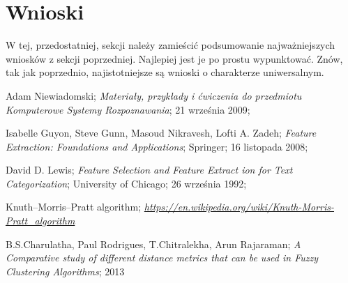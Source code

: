 \documentclass{classrep}
\begin{document}
\section{Wnioski}
{\color{blue}W tej, przedostatniej, sekcji należy zamieścić podsumowanie
najważniejszych wniosków z sekcji poprzedniej. Najlepiej jest je po prostu
wypunktować. Znów, tak jak poprzednio, najistotniejsze są wnioski o
charakterze uniwersalnym.}


\begin{thebibliography}{0}

 Adam Niewiadomski;
\textsl{Materiały, przykłady i ćwiczenia do przedmiotu
Komputerowe Systemy Rozpoznawania}; 21 września 2009;

 Isabelle Guyon, Steve Gunn, Masoud Nikravesh, Lofti A. Zadeh;
\textsl{Feature Extraction: Foundations and Applications}; Springer; 16 listopada 2008;

 David D. Lewis;
\textsl{Feature Selection and Feature Extract ion for Text Categorization}; University of Chicago; 26 września 1992;

 Knuth–Morris–Pratt algorithm;
\textsl{\url{https://en.wikipedia.org/wiki/Knuth-Morris-Pratt_algorithm}}

 B.S.Charulatha, Paul Rodrigues, T.Chitralekha, Arun Rajaraman;
\textsl{A Comparative study of different distance metrics that can be used in Fuzzy Clustering Algorithms}; 2013

\end{thebibliography}
\end{document}
